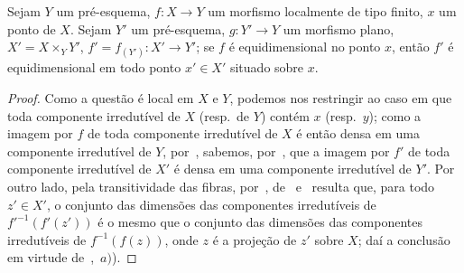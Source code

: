 \begin{proposition}[13.3.8]
\label{IV.13.3.8}
Sejam $Y$ um pré-esquema, $f:X\to Y$ um morfismo localmente de tipo finito,
$x$ um ponto de $X$.
Sejam $Y'$ um pré-esquema, $g:Y'\to Y$ um morfismo plano,
$X'=X\times_Y Y'$, $f'=f_{(Y')}:X'\to Y'$; se $f$ é equidimensional no
ponto $x$, então $f'$ é equidimensional em todo ponto $x'\in X'$ situado
sobre $x$.
\end{proposition}

\begin{proof}
Como a questão é local em $X$ e $Y$, podemos nos restringir ao caso em que
toda componente irredutível de $X$ (resp.~de $Y$) contém $x$ (resp.~$y$);
como a imagem por $f$ de toda componente irredutível de $X$ é então densa
em uma componente irredutível de $Y$, por~, sabemos,
por~, que a imagem por $f'$ de toda componente irredutível
de $X'$ é densa em uma componente irredutível de $Y'$.
Por outro lado, pela transitividade das fibras, por~,
de~ e~ resulta que, para todo $z'\in X'$,
o conjunto das dimensões das componentes irredutíveis de
${f'}^{-1}(f'(z'))$ é o mesmo que o conjunto das dimensões das componentes
irredutíveis de $f^{-1}(f(z))$, onde $z$ é a projeção de $z'$ sobre $X$;
daí a conclusão em virtude de~,~$a)$).
\end{proof}

